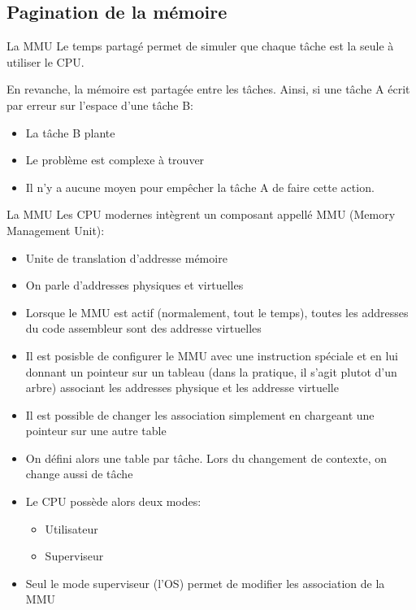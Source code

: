 \subsection{Pagination de la mémoire}

\begin{frame}{La MMU}
  Le temps partagé  permet de simuler que chaque tâche  est la seule à
  utiliser le CPU.

  En revanche, la mémoire est partagée entre les tâches. Ainsi, si une
  tâche A écrit par erreur sur l'espace d'une tâche B:
  \begin{itemize} 
  \item  La tâche B plante
  \item  Le problème est complexe à trouver
  \item Il  n'y a  aucune moyen  pour empêcher la  tâche A  de faire
    cette action.
  \end{itemize} 
\end{frame}

\begin{frame}{La MMU}  
  Les  CPU  modernes  intègrent   un  composant  appellé  MMU  (Memory
  Management Unit):
  \begin{itemize}
  \item  Unite de translation d'addresse mémoire
  \item  On parle d'addresses physiques et virtuelles
  \item Lorsque le MMU est  actif (normalement, tout le temps), toutes
    les addresses du code assembleur sont des addresse virtuelles
  \item  Il est  posisble de  configurer le  MMU avec  une instruction
    spéciale et  en lui  donnant un pointeur  sur un tableau  (dans la
    pratique,  il s'agit  plutot d'un  arbre) associant  les addresses
    physique et les addresse virtuelle
  \item  Il est  possible  de changer  les  association simplement  en
    chargeant une pointeur sur une autre table
  \item On  défini alors une table  par tâche.  Lors  du changement de
    contexte, on change aussi de tâche
  \item Le CPU possède alors deux modes:
    \begin{itemize}
    \item  Utilisateur
    \item  Superviseur
    \end{itemize} 
  \item  Seul  le  mode  superviseur  (l'OS) permet  de  modifier  les
    association de la MMU
  \end{itemize}
\end{frame} 

